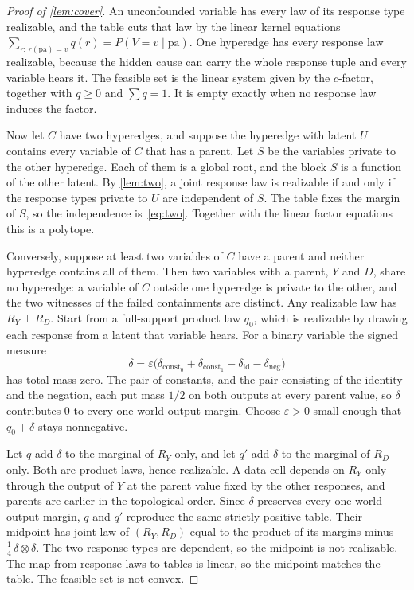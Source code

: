 \begin{proof}[Proof of \cref{lem:cover}]
An unconfounded variable has every law of its response type realizable, and the table cuts that law by the linear kernel equations $\sum_{r:\,r(\mathrm{pa})=v}q(r)=P(V{=}v\mid\mathrm{pa})$. One hyperedge has every response law realizable, because the hidden cause can carry the whole response tuple and every variable hears it. The feasible set is the linear system given by the $c$-factor, together with $q\ge 0$ and $\sum q=1$. It is empty exactly when no response law induces the factor.

Now let $C$ have two hyperedges, and suppose the hyperedge with latent $U$ contains every variable of $C$ that has a parent. Let $S$ be the variables private to the other hyperedge. Each of them is a global root, and the block $S$ is a function of the other latent. By \cref{lem:two}, a joint response law is realizable if and only if the response types private to $U$ are independent of $S$. The table fixes the margin of $S$, so the independence is~\eqref{eq:two}. Together with the linear factor equations this is a polytope.

Conversely, suppose at least two variables of $C$ have a parent and neither hyperedge contains all of them. Then two variables with a parent, $Y$ and $D$, share no hyperedge: a variable of $C$ outside one hyperedge is private to the other, and the two witnesses of the failed containments are distinct. Any realizable law has $R_Y\perp R_D$. Start from a full-support product law $q_0$, which is realizable by drawing each response from a latent that variable hears. For a binary variable the signed measure
\[
\delta=\varepsilon\bigl(\delta_{\mathrm{const}_0}+\delta_{\mathrm{const}_1}-\delta_{\mathrm{id}}-\delta_{\mathrm{neg}}\bigr)
\]
has total mass zero. The pair of constants, and the pair consisting of the identity and the negation, each put mass $1/2$ on both outputs at every parent value, so $\delta$ contributes $0$ to every one-world output margin. Choose $\varepsilon>0$ small enough that $q_0+\delta$ stays nonnegative.

Let $q$ add $\delta$ to the marginal of $R_Y$ only, and let $q'$ add $\delta$ to the marginal of $R_D$ only. Both are product laws, hence realizable. A data cell depends on $R_Y$ only through the output of $Y$ at the parent value fixed by the other responses, and parents are earlier in the topological order. Since $\delta$ preserves every one-world output margin, $q$ and $q'$ reproduce the same strictly positive table. Their midpoint has joint law of $(R_Y,R_D)$ equal to the product of its margins minus $\tfrac14\,\delta\otimes\delta$. The two response types are dependent, so the midpoint is not realizable. The map from response laws to tables is linear, so the midpoint matches the table. The feasible set is not convex.
\end{proof}


